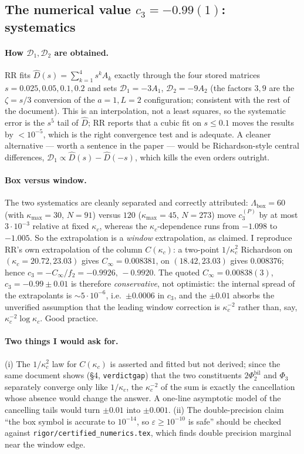 \documentclass[11pt]{article}
\begin{document}
\subsection{The numerical value $c_3=-0.99(1)$: systematics}\label{sec:c3num}

\paragraph{How $\mathcal D_1,\mathcal D_2$ are obtained.}  RR fits
$\widehat D(s)=\sum_{k=1}^4s^kA_k$ exactly through the four stored matrices
$s=0.025,0.05,0.1,0.2$ and sets $\mathcal D_1=-3A_1$, $\mathcal D_2=-9A_2$ (the factors $3,9$ are
the $\zeta=s/3$ conversion of the $a=1,L=2$ configuration; consistent with the rest of the
document).  This is an interpolation, not a least squares, so the systematic error is the
$s^5$ tail of $\widehat D$; RR reports that a cubic fit on $s\le0.1$ moves the results by
$<10^{-5}$, which is the right convergence test and is adequate.  A cleaner alternative --- worth a
sentence in the paper --- would be Richardson-style central differences,
$\mathcal D_1\propto\widehat D(s)-\widehat D(-s)$, which kills the even orders outright.

\paragraph{Box versus window.}  The two systematics are cleanly separated and correctly attributed:
$\Lambda_{\text{box}}=60$ (with $\kappa_{\max}=30$, $N=91$) versus $120$ ($\kappa_{\max}=45$,
$N=273$) move $c_3^{(P)}$ by at most $3\cdot10^{-3}$ relative at fixed $\kappa_c$, whereas the
$\kappa_c$-dependence runs from $-1.098$ to $-1.005$.  So the extrapolation is a
\emph{window} extrapolation, as claimed.  I reproduce RR's own extrapolation of the column
$C(\kappa_c)$: a two-point $1/\kappa_c^2$ Richardson on $(\kappa_c=20.72,23.03)$ gives
$C_\infty=0.008381$, on $(18.42,23.03)$ gives $0.008376$; hence
$c_3=-C_\infty/f_2=-0.9926,\,-0.9920$.  The quoted $C_\infty=0.00838(3)$, $c_3=-0.99\pm0.01$ is
therefore \emph{conservative}, not optimistic: the internal spread of the extrapolants is
$\sim5\cdot10^{-6}$, i.e.\ $\pm0.0006$ in $c_3$, and the $\pm0.01$ absorbs the unverified
assumption that the leading window correction is $\kappa_c^{-2}$ rather than, say,
$\kappa_c^{-2}\log\kappa_c$.  Good practice.

\paragraph{Two things I would ask for.}  (i) The $1/\kappa_c^2$ law for $C(\kappa_c)$ is asserted
and fitted but not derived; since the same document shows (\S4, \texttt{verdictgap}) that the two
constituents $2\Phi_2^{\mathrm{bil}}$ and $\Phi_3$ separately converge only like $1/\kappa_c$, the
$\kappa_c^{-2}$ of the sum is exactly the cancellation whose absence would change the answer.  A
one-line asymptotic model of the cancelling tails would turn $\pm0.01$ into $\pm0.001$.
(ii) The double-precision claim ``the box symbol is accurate to $10^{-14}$, so
$\varepsilon\ge10^{-10}$ is safe'' should be checked against
\texttt{rigor/certified\_numerics.tex}, which finds double precision marginal near the window edge.
\end{document}
